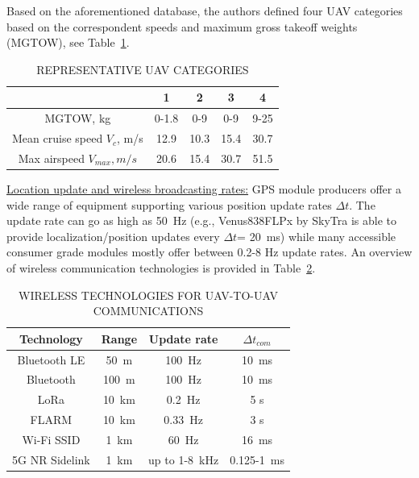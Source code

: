 \documentclass[10pt,conference]{IEEEtran}
\begin{document}
Based on the aforementioned database, the authors defined four UAV categories based on the correspondent speeds and maximum gross takeoff weights (MGTOW), see Table~\ref{tab:velocity}. 
\begin{table}[t]
    \centering
    \vspace{1mm}
        \caption{REPRESENTATIVE UAV CATEGORIES}
    \begin{tabular}{c|c|c|c|c}
        &1&2&3&4  \\
        \hline
        MGTOW, kg&0-1.8&0-9&0-9&9-25\\
        Mean cruise speed $V_c$, m/s&12.9&10.3&15.4&30.7\\
        Max airspeed $V_{max}, m/s$&20.6&15.4&30.7&51.5\\
        
    \end{tabular}
    \label{tab:velocity}
\end{table}

\underline{Location update and wireless broadcasting rates:}
GPS module producers offer a wide range of equipment supporting various position update rates $\Delta t$. The update rate can go as high as 50~Hz (e.g., Venus838FLPx by SkyTra is able to provide localization/position updates every $\Delta t$= 20~ms) while many accessible consumer grade modules mostly offer between 0.2-8 Hz update rates.
An overview of wireless communication technologies is provided in Table~\ref{tab:techs}. %
\begin{table}[t]
    \centering
        \caption{WIRELESS TECHNOLOGIES FOR UAV-TO-UAV COMMUNICATIONS}
    \begin{tabular}{c|c|c|c}
    Technology & {Range} & {Update rate}& $\Delta t_{com}$  \\
    \hline
    Bluetooth LE & 50~m & 100~Hz& 10~ms \\
    Bluetooth & 100~m & 100~Hz& 10~ms \\
    LoRa \cite{Vinogradov20} & 10~km & 0.2~Hz& 5 s  \\
    FLARM \cite{8514548}  & 10~km & 0.33~Hz & 3 s  \\
    Wi-Fi SSID \cite{9133405}&1~km&60~Hz& 16~ms \\
    5G NR Sidelink \cite{9345798}&1~km& up to 1-8~kHz& 0.125-1~ms\\
    \end{tabular}
\vspace{-6mm}
    \label{tab:techs}
\end{table}
\end{document}
